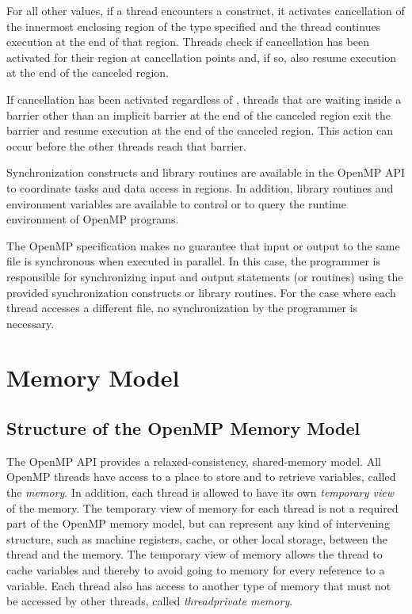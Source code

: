 For all other  values, if a 
thread encounters a  construct, it
activates cancellation of the innermost enclosing region of the type specified and the 
thread continues execution at the end of that region. Threads check if cancellation has 
been activated for their region at cancellation points and, if so, also resume execution at 
the end of the canceled region.

If cancellation has been activated regardless of , 
threads that are
waiting inside a barrier other than an implicit barrier at the end of the canceled region 
exit the barrier and resume execution at the end of the canceled region. This action can 
occur before the other threads reach that barrier.

Synchronization constructs and library routines are available in the OpenMP API to 
coordinate tasks and data access in  regions. In addition, library routines and
environment variables are available to control or to query the runtime environment of 
OpenMP programs.

The OpenMP specification makes no guarantee that input or output to the same file is 
synchronous when executed in parallel. In this case, the programmer is responsible for 
synchronizing input and output statements (or routines) using the provided 
synchronization constructs or library routines. For the case where each thread accesses a 
different file, no synchronization by the programmer is necessary.








\section{Memory Model}
\label{sec:Memory Model}
\subsection{Structure of the OpenMP Memory Model}
\label{subsec:Structure of the OpenMP Memory Model}
The OpenMP API provides a relaxed-consistency, shared-memory model. All OpenMP
threads have access to a place to store and to retrieve variables, 
called the \emph{memory}. In
addition, each thread is allowed to have its own \emph{temporary view} of the memory. The
temporary view of memory for each thread is not a required part of the OpenMP
memory model, but can represent any kind of intervening structure, such as machine
registers, cache, or other local storage, between the thread and the memory. The
temporary view of memory allows the thread to cache variables and thereby to avoid
going to memory for every reference to a variable. Each thread also has access to
another type of memory that must not be accessed by other threads, 
called \emph{threadprivate memory}.

